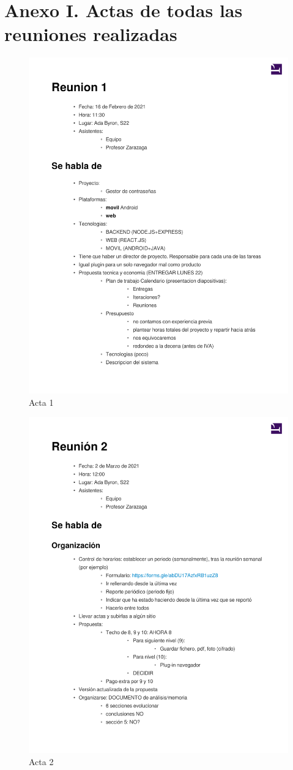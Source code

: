 \documentclass{article}
\begin{document}
\section*{Anexo I. Actas de todas las reuniones realizadas}
\begin{figure}
    \includegraphics[width=.8\textwidth]{../../actas_reuniones/acta1.pdf}
    \caption{Acta 1}
\end{figure}
\begin{figure}
    \includegraphics[width=.8\textwidth]{../../actas_reuniones/acta2.pdf}
    \caption{Acta 2}
\end{figure}
\end{document}
